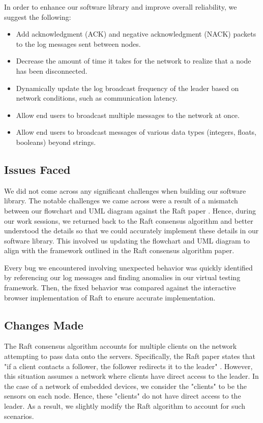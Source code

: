 In order to enhance our software library and improve overall reliability, we suggest the following:

\begin{itemize}
  \item Add acknowledgment (ACK) and negative acknowledgment (NACK) packets to the log messages sent between nodes.
  \item Decrease the amount of time it takes for the network to realize that a node has been disconnected.
  \item Dynamically update the log broadcast frequency of the leader based on network conditions, such as communication latency.
  \item Allow end users to broadcast multiple messages to the network at once.
  \item Allow end users to broadcast messages of various data types (integers, floats, booleans) beyond strings.
\end{itemize}


\subsection{Issues Faced}
We did not come across any significant challenges when building our software library. The notable challenges we came across were a result of a mismatch between our flowchart and UML diagram against the Raft paper \cite{raft_paper}. Hence, during our work sessions, we returned back to the Raft consensus algorithm and better understood the details so that we could accurately implement these details in our software library. This involved us updating the flowchart and UML diagram to align with the framework outlined in the Raft consensus algorithm paper.

Every bug we encountered involving unexpected behavior was quickly identified by referencing our log messages and finding anomalies in our virtual testing framework. Then, the fixed behavior was compared against the interactive browser implementation of Raft \cite{raft_website} to ensure accurate implementation. 

\subsection{Changes Made}
\label{sub:changes_made}
The Raft consensus algorithm accounts for multiple clients on the network attempting to pass data onto the servers. Specifically, the Raft paper states that "if a client contacts a follower, the follower redirects it to the leader" \cite{raft_paper}. However, this situation assumes a network where clients have direct access to the leader. In the case of a network of embedded devices, we consider the "clients" to be the sensors on each node. Hence, these "clients" do not have direct access to the leader. As a result, we slightly modify the Raft algorithm to account for such scenarios. 

